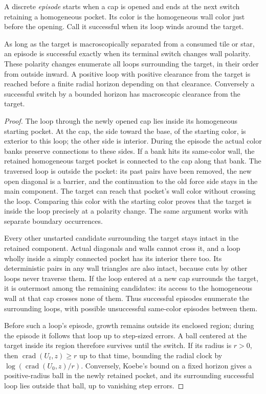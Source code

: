 A discrete \emph{episode} starts when a cap is opened and ends at the
next switch retaining a homogeneous pocket.  Its color is the
homogeneous wall color just before the opening.  Call it successful
when its loop winds around the target.

\begin{lemma}\label{loop:episode-order}
As long as the target is macroscopically separated from a consumed
tile or star, an episode is successful exactly when its terminal
switch changes wall polarity.  These polarity changes enumerate all
loops surrounding the target, in their order from outside inward.
A positive loop with positive clearance from the target is reached
before a finite radial horizon depending on that clearance.
Conversely a successful switch by a bounded horizon has macroscopic
clearance from the target.
\end{lemma}

\begin{proof}
The loop through the newly opened cap lies inside its homogeneous
starting pocket.  At the cap, the side toward the base, of the
starting color, is exterior to this loop; the other side is interior.
During the episode the actual color banks preserve connections to
these sides.  If a bank hits its same-color wall, the retained
homogeneous target pocket is connected to the cap along that bank.
The traversed loop is outside the pocket: its past pairs have been
removed, the new open diagonal is a barrier, and the continuation to
the old force side stays in the main component.  The target can reach
that pocket's wall color without crossing the loop.  Comparing this
color with the starting color proves that the target is inside the
loop precisely at a polarity change.  The same argument works with
separate boundary occurrences.

Every other unstarted candidate surrounding the target stays intact
in the retained component.  Actual diagonals and walls cannot cross
it, and a loop wholly inside a simply connected pocket has its
interior there too.  Its deterministic pairs in any wall triangles
are also intact, because cuts by other loops never traverse them.
If the loop entered at a new cap surrounds the target, it is outermost
among the remaining candidates: its access to the homogeneous wall
at that cap crosses none of them.  Thus successful episodes enumerate
the surrounding loops, with possible unsuccessful same-color episodes
between them.

Before such a loop's episode, growth remains outside its enclosed
region; during the episode it follows that loop up to step-sized
errors.  A ball centered at the target inside its region therefore
survives until the switch.  If its radius is $r>0$, then
$\operatorname{crad}(U_t,z)\ge r$ up to that time, bounding the
radial clock by $\log(\operatorname{crad}(U_0,z)/r)$.
Conversely, Koebe's bound on a fixed horizon gives a positive-radius
ball in the newly retained pocket, and its surrounding successful
loop lies outside that ball, up to vanishing step errors.
\end{proof}

